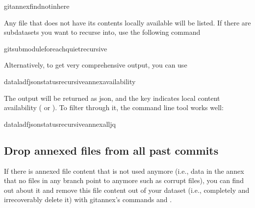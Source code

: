 \begin{sphinxVerbatim}[commandchars=\\\{\}]
gitannexfind\PYGZhy{}\PYGZhy{}not\PYGZhy{}\PYGZhy{}inhere
\end{sphinxVerbatim}

\sphinxAtStartPar
Any file that does not have its contents locally available will be listed.
If there are subdatasets you want to recurse into, use the following command

\begin{sphinxVerbatim}[commandchars=\\\{\}]
gitsubmoduleforeach\PYGZhy{}\PYGZhy{}quiet\PYGZhy{}\PYGZhy{}recursive
\end{sphinxVerbatim}

\sphinxAtStartPar
Alternatively, to get very comprehensive output, you can use

\begin{sphinxVerbatim}[commandchars=\\\{\}]
datalad\PYGZhy{}fjsonstatus\PYGZhy{}\PYGZhy{}recursive\PYGZhy{}\PYGZhy{}annexavailability
\end{sphinxVerbatim}

\sphinxAtStartPar
The output will be returned as json, and the key  indicates local
content availability ( or ). To filter through it, the command
line tool  works well:

\begin{sphinxVerbatim}[commandchars=\\\{\}]
datalad\PYGZhy{}fjsonstatus\PYGZhy{}\PYGZhy{}recursive\PYGZhy{}\PYGZhy{}annexalljq
\end{sphinxVerbatim}


\subsection{Drop annexed files from all past commits}
\label{\detokenize{basics/101-146-gists:drop-annexed-files-from-all-past-commits}}
\sphinxAtStartPar
If there is annexed file content that is not used anymore (i.e., data in the
annex that no files in any branch point to anymore such as corrupt files),
you can find out about it and remove this file content out of your dataset
(i.e., completely and irrecoverably delete it) with git\sphinxhyphen{}annex’s commands
 and .

